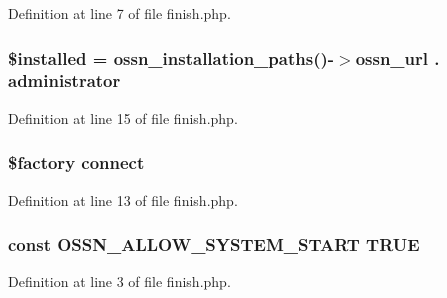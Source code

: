 Definition at line 7 of file finish.\+php.

\subsubsection[{\texorpdfstring{\$installed}{$installed}}]{\setlength{\rightskip}{0pt plus 5cm}\$installed = {\bf ossn\+\_\+installation\+\_\+paths}()-\/$>${\bf ossn\+\_\+url} . \textquotesingle{}administrator\textquotesingle{}}\hypertarget{finish_8php_abedccaa71dcf3d3f5c392fad3b3df965}{}\label{finish_8php_abedccaa71dcf3d3f5c392fad3b3df965}


Definition at line 15 of file finish.\+php.

\subsubsection[{\texorpdfstring{connect}{connect}}]{\setlength{\rightskip}{0pt plus 5cm}\$factory connect}\hypertarget{finish_8php_a3fdbedd7713e458f25fcf7dc1f562a3d}{}\label{finish_8php_a3fdbedd7713e458f25fcf7dc1f562a3d}


Definition at line 13 of file finish.\+php.

\subsubsection[{\texorpdfstring{O\+S\+S\+N\+\_\+\+A\+L\+L\+O\+W\+\_\+\+S\+Y\+S\+T\+E\+M\+\_\+\+S\+T\+A\+RT}{OSSN_ALLOW_SYSTEM_START}}]{\setlength{\rightskip}{0pt plus 5cm}const O\+S\+S\+N\+\_\+\+A\+L\+L\+O\+W\+\_\+\+S\+Y\+S\+T\+E\+M\+\_\+\+S\+T\+A\+RT T\+R\+UE}\hypertarget{finish_8php_a73aeae1243c8451cb328ddfe84637175}{}\label{finish_8php_a73aeae1243c8451cb328ddfe84637175}


Definition at line 3 of file finish.\+php.

